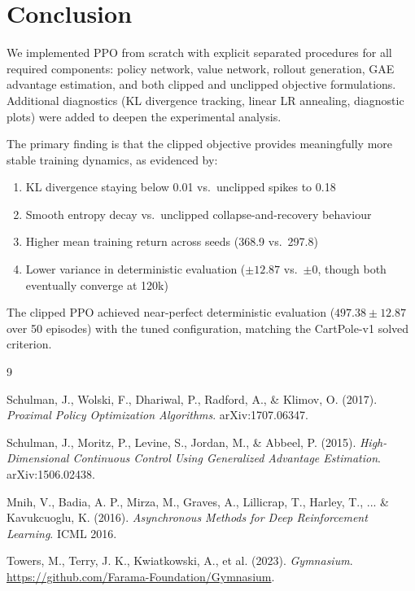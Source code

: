 \documentclass[12pt,a4paper]{article}
\begin{document}
\section{Conclusion}

We implemented PPO from scratch with explicit separated procedures for all required components: policy network, value network, rollout generation, GAE advantage estimation, and both clipped and unclipped objective formulations. Additional diagnostics (KL divergence tracking, linear LR annealing, diagnostic plots) were added to deepen the experimental analysis.

The primary finding is that the clipped objective provides meaningfully more stable training dynamics, as evidenced by:
\begin{enumerate}[noitemsep]
    \item KL divergence staying below 0.01 vs.\ unclipped spikes to 0.18
    \item Smooth entropy decay vs.\ unclipped collapse-and-recovery behaviour
    \item Higher mean training return across seeds (368.9 vs.\ 297.8)
    \item Lower variance in deterministic evaluation ($\pm 12.87$ vs.\ $\pm 0$, though both eventually converge at 120k)
\end{enumerate}

The clipped PPO achieved near-perfect deterministic evaluation ($497.38 \pm 12.87$ over 50 episodes) with the tuned configuration, matching the CartPole-v1 solved criterion.

\begin{thebibliography}{9}

Schulman, J., Wolski, F., Dhariwal, P., Radford, A., \& Klimov, O. (2017).
\textit{Proximal Policy Optimization Algorithms}.
arXiv:1707.06347.

Schulman, J., Moritz, P., Levine, S., Jordan, M., \& Abbeel, P. (2015).
\textit{High-Dimensional Continuous Control Using Generalized Advantage Estimation}.
arXiv:1506.02438.

Mnih, V., Badia, A. P., Mirza, M., Graves, A., Lillicrap, T., Harley, T., ... \& Kavukcuoglu, K. (2016).
\textit{Asynchronous Methods for Deep Reinforcement Learning}.
ICML 2016.

Towers, M., Terry, J. K., Kwiatkowski, A., et al. (2023).
\textit{Gymnasium}.
\url{https://github.com/Farama-Foundation/Gymnasium}.

\end{thebibliography}
\end{document}
